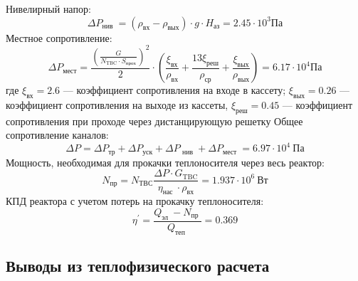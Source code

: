 \noindent Нивелирный напор:
$$
\Delta P_{\text {нив }}=\left(\rho_{\text{вх}}-\rho_{\text{вых}}\right) \cdot g \cdot H_{\text{аз}}=2.45 \cdot 10^{3} \text{Па}
$$
Местное сопротивление:
$$
\Delta P_{\mathrm{мест}}=\frac{\left(\frac{G}{N_{\mathrm{TBC}} \cdot S_{\mathrm{прох}}}\right)^{2}}{2} \cdot\left(\frac{\xi_{\mathrm{вх}}}{\rho_{\mathrm{вх}}}+\frac{13 \xi_{\mathrm{реш}}}{\rho_{\mathrm{ср}}}+\frac{\xi_{\mathrm{вых}}}{\rho_{\mathrm{вых}}}\right)= 6.17 \cdot 10^4 \text{Па}
$$
где $\xi_{\text{вх}}= 2.6 $ — коэффициент сопротивления на входе в кассету; $\xi_{\text{вых}} = 0.26$ — коэффициент сопротивления на выходе из кассеты, $\xi_{\text{реш}} = 0.45$ — коэффициент сопротивления при проходе через дистанцирующую решетку %
Общее сопротивление каналов:
$$
\Delta P=\Delta P_{\mathrm{тр}}+\Delta P_{\mathrm{уск}}+\Delta P_{\text { нив }}+\Delta P_{\text {мест }} = 6.97 \cdot 10^4\  \text{Па} 
$$
Мощность, необходимая для прокачки теплоносителя через весь реактор:
$$
N_{\mathrm{пр}}=N_{\mathrm{ТВС}} \frac{\Delta P \cdot G_{\mathrm{TBC}}}{\eta_{\text {нас }} \cdot \rho_{\mathrm{вх}}}= 1.937 \cdot 10^6\  \text{Вт}
$$
КПД реактора с учетом потерь на прокачку теплоносителя:
$$
\eta^{\prime}=\frac{Q_{\text {эл }}-N_{\text {пр }}}{Q_{\text {теп }}} = 0.369 
$$

\subsection{Выводы из теплофизического расчета}


